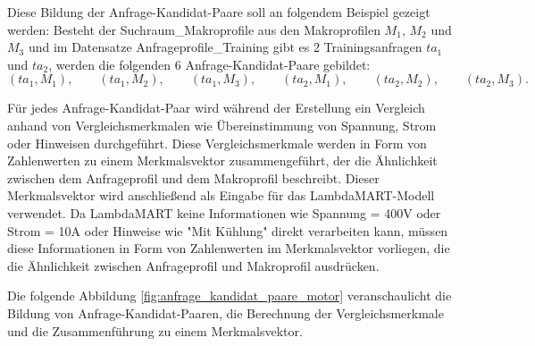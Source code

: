 Diese Bildung der Anfrage-Kandidat-Paare soll an folgendem Beispiel gezeigt werden:
Besteht der Suchraum\_Makroprofile aus den Makroprofilen \(M_1\), \(M_2\) und \(M_3\) und im Datensatze Anfrageprofile\_Training gibt es 2 Trainingsanfragen \(ta_1\) und \(ta_2\), 
werden die folgenden 6 Anfrage-Kandidat-Paare gebildet: \[ (ta_1,M_1), \qquad (ta_1,M_2), \qquad (ta_1,M_3), \qquad (ta_2,M_1), \qquad (ta_2,M_2), \qquad (ta_2,M_3). \] 

Für jedes Anfrage-Kandidat-Paar wird während der Erstellung ein Vergleich anhand von Vergleichsmerkmalen wie Übereinstimmung von Spannung, Strom oder Hinweisen durchgeführt. 
Diese Vergleichsmerkmale werden in Form von Zahlenwerten zu einem Merkmalsvektor zusammengeführt, der die Ähnlichkeit zwischen dem Anfrageprofil und dem Makroprofil beschreibt.
Dieser Merkmalsvektor wird anschließend als Eingabe für das LambdaMART-Modell verwendet.
Da LambdaMART keine Informationen wie Spannung = 400V oder Strom = 10A oder Hinweise wie "Mit Kühlung" direkt verarbeiten kann, 
müssen diese Informationen in Form von Zahlenwerten im Merkmalsvektor vorliegen, die die Ähnlichkeit zwischen Anfrageprofil und Makroprofil ausdrücken.

Die folgende Abbildung \ref{fig:anfrage_kandidat_paare_motor} veranschaulicht die Bildung von Anfrage-Kandidat-Paaren, die Berechnung der Vergleichsmerkmale und die Zusammenführung zu einem Merkmalsvektor.

